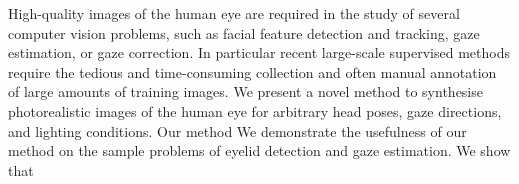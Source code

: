 
High-quality images of the human eye are required in the study of several computer vision problems, such as facial feature detection and tracking, gaze estimation, or gaze correction.
In particular recent large-scale supervised methods require the tedious and time-consuming collection and often manual annotation of large amounts of training images.
We present a novel method to synthesise photorealistic images of the human eye for arbitrary head poses, gaze directions, and lighting conditions.
Our method 
We demonstrate the usefulness of our method on the sample problems of eyelid detection and gaze estimation.
We show that 